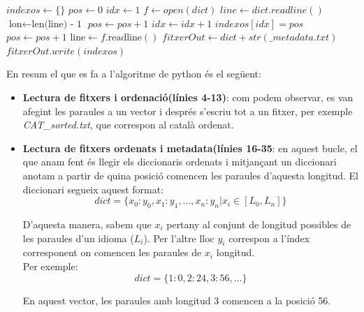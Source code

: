 \documentclass[conference]{IEEEtran}
\begin{document}
\begin{itemize}
\begin{algorithm}
\begin{algorithmic}[1]
                        \State $indexos \gets \{ \}$
                        \State $pos\gets  0$
                        \State $idx \gets 1$
                        \State $f \gets open(dict)$
                        \State $line \gets dict.readline()$
                            \State $\textrm{lon} \gets \textrm{len(line) - 1}$
                                \State $pos \gets pos+1$
                            \Else
                                \State $idx \gets idx+1$
                                \State $indexos[idx]=pos$
                                \State $pos \gets pos+1$
                            \EndIf
                            \State $\textrm{line} \gets f.\textrm{readline}()$
                        \EndWhile
                        \State $fitxerOut \gets dict+str(\_metadata.txt)$
                        \State $fitxerOut.write(indexos)$
                    \EndFor
                    \end{algorithmic}
                \end{algorithm}

            En resum el que es fa a l'algoritme de python és el següent:

            \begin{itemize}
                \item \textbf{Lectura de fitxers i ordenació(línies 4-13)}: com podem observar, es van afegint les paraules a un vector i després s'escriu tot a un fitxer, per exemple \textit{CAT\_sorted.txt}, que correspon al català ordenat.\\
                \item \textbf{Lectura de fitxers ordenats i metadata(línies 16-35}: en aquest bucle, el que anam fent és llegir els diccionaris ordenats i mitjançant un diccionari anotam a partir de quina posició comencen les paraules d'aquesta longitud. El diccionari segueix aquest format:
                $$dict=\{x_{0}:y_{0},x_{1}:y_{1},...,x_{n}:y_{n}|x_i \in [L_0,L_n]\}$$

                D'aquesta manera, sabem que $x_i$ pertany al conjunt de longitud possibles de les paraules d'un idioma ($L_i$). Per l'altre lloc $y_i$ correspon a l'índex corresponent on comencen les paraules de $x_i$ longitud.\\ Per exemple: \\

                $$dict=\{1:0,2:24,3:56,...\}$$

                En aquest vector, les paraules amb longitud 3 comencen a la posició 56.
            \end{itemize}

        \end{itemize}
\end{document}
